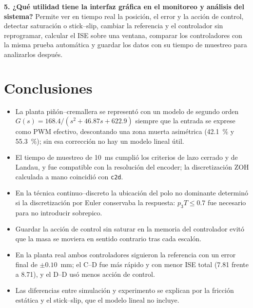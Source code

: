 \documentclass[conference]{IEEEtran}
\begin{document}
\textbf{5. ¿Qué utilidad tiene la interfaz gráfica en el monitoreo y análisis
del sistema?} Permite ver en tiempo real la posición, el error y la acción de
control, detectar saturación o stick--slip, cambiar la referencia y el
controlador sin reprogramar, calcular el ISE sobre una ventana, comparar los
controladores con la misma prueba automática y guardar los datos con su tiempo
de muestreo para analizarlos después.

\section{Conclusiones}

\begin{itemize}
  \item La planta piñón--cremallera se representó con un modelo de segundo
        orden $G(s) = 168.4/(s^2 + 46.87s + 622.9)$ siempre que la entrada se
        exprese como PWM efectivo, descontando una zona muerta asimétrica
        (42.1~\% y 55.3~\%); sin esa corrección no hay un modelo lineal útil.
  \item El tiempo de muestreo de 10~ms cumplió los criterios de lazo cerrado y
        de Landau, y fue compatible con la resolución del encoder; la
        discretización ZOH calculada a mano coincidió con \texttt{c2d}.
  \item En la técnica continuo--discreto la ubicación del polo no dominante
        determinó si la discretización por Euler conservaba la respuesta:
        $p_3T \le 0.7$ fue necesario para no introducir sobrepico.
  \item Guardar la acción de control sin saturar en la memoria del controlador
        evitó que la masa se moviera en sentido contrario tras cada escalón.
  \item En la planta real ambos controladores siguieron la referencia con un
        error final de $\pm0.10$~mm; el C--D fue más rápido y con menor ISE total
        (7.81 frente a 8.71), y el D--D usó menos acción de control.
  \item Las diferencias entre simulación y experimento se explican por la
        fricción estática y el stick--slip, que el modelo lineal no incluye.
\end{itemize}
\end{document}
